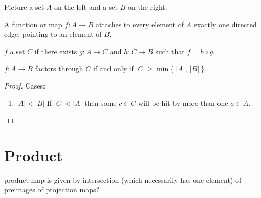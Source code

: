 Picture a set $A$ on the left and a set $B$ on the right.

A { function} or { map} $f: A \to B$ attaches to every element of $A$ exactly one directed edge, pointing to an element
of $B$.

$f$  a set $C$ if there exists $g: A \to C$ and $h: C \to B$ such that $f = h \circ g$.

\begin{claim}
  $f: A \to B$ factors through $C$ if and only if $|C| \geq \min\{ ~|A|, ~|B|~ \}$.
\end{claim}

\begin{proof}
  Cases:
  \begin{enumerate}
  \item $|A| < |B|$
    If $|C| < |A|$ then some $c \in C$ will be hit by more than one $a \in A$.
  \end{enumerate}
\end{proof}



\section{Product}

product map is given by intersection (which necessarily has one element) of preimages of projection maps?




